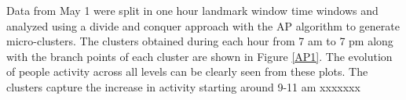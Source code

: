 Data from May 1 were split in one hour landmark window time windows and analyzed using a divide and conquer approach with the AP algorithm to generate micro-clusters. The clusters obtained during each hour from 7 am to 7 pm along with the branch points of each cluster are shown in Figure \ref{AP1}. The evolution of people activity across all levels can be clearly seen from these plots. The clusters capture the increase in activity starting around 9-11 am xxxxxxx





